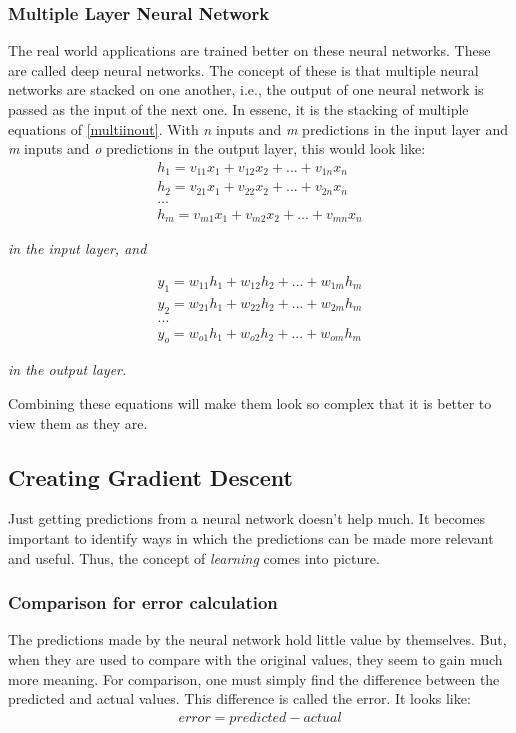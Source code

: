 \documentclass[conference,compsoc]{IEEEtran}
\begin{document}
\subsubsection{Multiple Layer Neural Network}
The real world applications are trained better on these neural networks. These are called deep neural networks. The concept of these is that multiple neural networks are stacked on one another, i.e., the output of one neural network is passed as the input of the next one.  In essenc, it is the stacking of multiple equations of \ref{multiinout}. With \emph{n} inputs and \emph{m} predictions in the input layer and \emph{m} inputs and \emph{o} predictions in the output layer, this would look like:
\begin{gather*}\label{firstlayermultiinout}
    h_1 = v_{11}x_1+v_{12}x_2+...+v_{1n}x_n \\
    h_2 = v_{21}x_1+v_{22}x_2+...+v_{2n}x_n \\
    ... \\
    h_m = v_{m1}x_1+v_{m2}x_2+...+v_{mn}x_n 
\end{gather*}
\begin{center}\textit{
    in the input layer, and }
\end{center}
\begin{gather*}\label{secondlayermultiinout}
    y_1 = w_{11}h_1+w_{12}h_2+...+w_{1m}h_m \\
    y_2 = w_{21}h_1+w_{22}h_2+...+w_{2m}h_m \\
    ... \\
    y_o = w_{o1}h_1+w_{o2}h_2+...+w_{om}h_m 
\end{gather*}
\begin{center}\textit{
    in the output layer.}
\end{center}
Combining these equations will make them look so complex that it is better to view them as they are.

\subsection{Creating Gradient Descent}
Just getting predictions from a neural network doesn't help much. It becomes important to identify ways in which the predictions can be made more relevant and useful. Thus, the concept of \emph{learning} comes into picture.

\subsubsection{Comparison for error calculation}
The predictions made by the neural network hold little value by themselves. But, when they are used to compare with the original values, they seem to gain much more meaning. For comparison, one must simply find the difference between the predicted and actual values. This difference is called the error. It looks like:
\begin{gather*}
\label{error}
    error = predicted-actual
\end{gather*}
\end{document}
